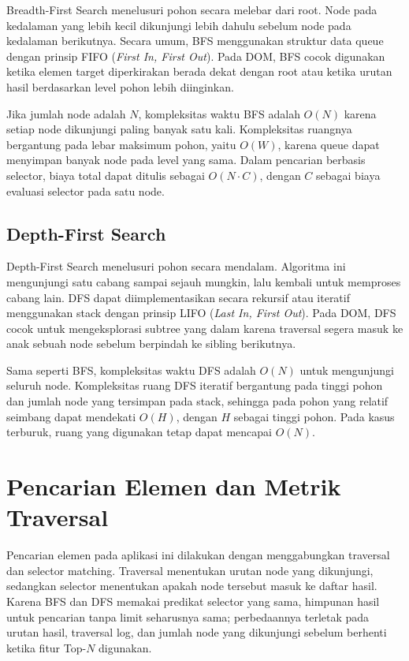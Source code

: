 Breadth-First Search menelusuri pohon secara melebar dari root. Node pada kedalaman yang lebih kecil dikunjungi lebih dahulu sebelum node pada kedalaman berikutnya. Secara umum, BFS menggunakan struktur data queue dengan prinsip FIFO (\textit{First In, First Out}). Pada DOM, BFS cocok digunakan ketika elemen target diperkirakan berada dekat dengan root atau ketika urutan hasil berdasarkan level pohon lebih diinginkan.

Jika jumlah node adalah $N$, kompleksitas waktu BFS adalah $O(N)$ karena setiap node dikunjungi paling banyak satu kali. Kompleksitas ruangnya bergantung pada lebar maksimum pohon, yaitu $O(W)$, karena queue dapat menyimpan banyak node pada level yang sama. Dalam pencarian berbasis selector, biaya total dapat ditulis sebagai $O(N \cdot C)$, dengan $C$ sebagai biaya evaluasi selector pada satu node.

\subsection{Depth-First Search}

Depth-First Search menelusuri pohon secara mendalam. Algoritma ini mengunjungi satu cabang sampai sejauh mungkin, lalu kembali untuk memproses cabang lain. DFS dapat diimplementasikan secara rekursif atau iteratif menggunakan stack dengan prinsip LIFO (\textit{Last In, First Out}). Pada DOM, DFS cocok untuk mengeksplorasi subtree yang dalam karena traversal segera masuk ke anak sebuah node sebelum berpindah ke sibling berikutnya.

Sama seperti BFS, kompleksitas waktu DFS adalah $O(N)$ untuk mengunjungi seluruh node. Kompleksitas ruang DFS iteratif bergantung pada tinggi pohon dan jumlah node yang tersimpan pada stack, sehingga pada pohon yang relatif seimbang dapat mendekati $O(H)$, dengan $H$ sebagai tinggi pohon. Pada kasus terburuk, ruang yang digunakan tetap dapat mencapai $O(N)$.

\section{Pencarian Elemen dan Metrik Traversal}

Pencarian elemen pada aplikasi ini dilakukan dengan menggabungkan traversal dan selector matching. Traversal menentukan urutan node yang dikunjungi, sedangkan selector menentukan apakah node tersebut masuk ke daftar hasil. Karena BFS dan DFS memakai predikat selector yang sama, himpunan hasil untuk pencarian tanpa limit seharusnya sama; perbedaannya terletak pada urutan hasil, traversal log, dan jumlah node yang dikunjungi sebelum berhenti ketika fitur Top-$N$ digunakan.

